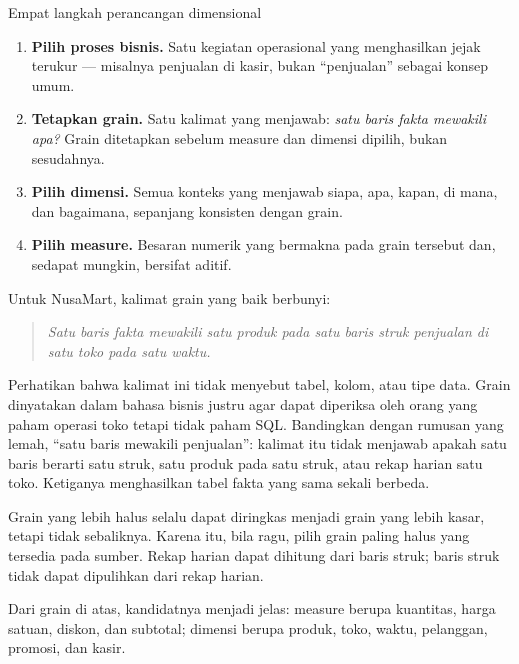 \begin{konsep}{Empat langkah perancangan dimensional}
\begin{enumerate}[leftmargin=1.4em]
  \item \textbf{Pilih proses bisnis.} Satu kegiatan operasional yang
        menghasilkan jejak terukur --- misalnya penjualan di kasir, bukan
        ``penjualan'' sebagai konsep umum.
  \item \textbf{Tetapkan grain.} Satu kalimat yang menjawab: \emph{satu baris
        fakta mewakili apa?} Grain ditetapkan sebelum measure dan dimensi
        dipilih, bukan sesudahnya.
  \item \textbf{Pilih dimensi.} Semua konteks yang menjawab siapa, apa, kapan,
        di mana, dan bagaimana, sepanjang konsisten dengan grain.
  \item \textbf{Pilih measure.} Besaran numerik yang bermakna pada grain
        tersebut dan, sedapat mungkin, bersifat aditif.
\end{enumerate}
\end{konsep}

Untuk NusaMart, kalimat grain yang baik berbunyi:

\begin{quote}
\emph{Satu baris fakta mewakili satu produk pada satu baris struk penjualan di
satu toko pada satu waktu.}
\end{quote}

Perhatikan bahwa kalimat ini tidak menyebut tabel, kolom, atau tipe data. Grain
dinyatakan dalam bahasa bisnis justru agar dapat diperiksa oleh orang yang
paham operasi toko tetapi tidak paham SQL. Bandingkan dengan rumusan yang
lemah, ``satu baris mewakili penjualan'': kalimat itu tidak menjawab apakah
satu baris berarti satu struk, satu produk pada satu struk, atau rekap harian
satu toko. Ketiganya menghasilkan tabel fakta yang sama sekali berbeda.

\begin{catatan}
Grain yang lebih halus selalu dapat diringkas menjadi grain yang lebih kasar,
tetapi tidak sebaliknya. Karena itu, bila ragu, pilih grain paling halus yang
tersedia pada sumber. Rekap harian dapat dihitung dari baris struk; baris struk
tidak dapat dipulihkan dari rekap harian.
\end{catatan}

Dari grain di atas, kandidatnya menjadi jelas: measure berupa kuantitas,
harga satuan, diskon, dan subtotal; dimensi berupa produk, toko, waktu,
pelanggan, promosi, dan kasir.

